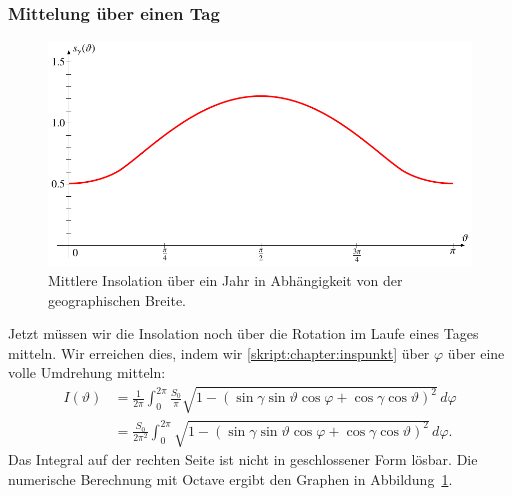 \subsubsection{Mittelung über einen Tag}
\begin{figure}
\centering
\includegraphics{chapters/5/ell2.pdf}
\caption{Mittlere Insolation über ein Jahr in Abhängigkeit von der
geographischen Breite.
\label{skript:einstrahlung:jahrinsbild}}
\end{figure}
Jetzt müssen wir die Insolation noch über die Rotation im Laufe eines 
Tages mitteln.
Wir erreichen dies, indem wir \eqref{skript:chapter:inspunkt}
über $\varphi$ über eine volle Umdrehung mitteln:
\begin{align*}
I(\vartheta)
&=
\frac{1}{2\pi}
\int_0^{2\pi}
\frac{S_0}{\pi}
\sqrt{1-
(\sin\gamma\sin\vartheta\cos\varphi+\cos\gamma\cos\vartheta)^2}
\,d\varphi
\\
&=
\frac{S_0}{2\pi^2}
\int_0^{2\pi}
\sqrt{1-
(\sin\gamma\sin\vartheta\cos\varphi+\cos\gamma\cos\vartheta)^2}
\,d\varphi.
\label{skript:einstrahlung:mittlereinsolation}
\end{align*}
Das Integral auf der rechten Seite ist nicht in geschlossener
Form lösbar.
Die numerische Berechnung mit Octave ergibt den Graphen
in Abbildung~\ref{skript:einstrahlung:jahrinsbild}.




